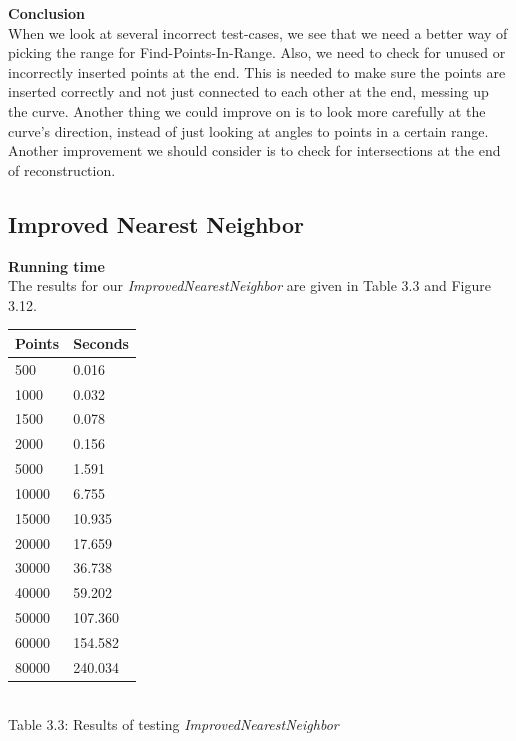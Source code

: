         \textbf{Conclusion}\\
        When we look at several incorrect test-cases, we see that we need a better way of picking the range for Find-Points-In-Range. Also, we need to check for unused or incorrectly inserted points at the end. This is needed to make sure the points are inserted correctly and not just connected to each other at the end, messing up the curve. Another thing we could improve on is to look more carefully at the curve's direction, instead of just looking at angles to points in a certain range. Another improvement we should consider is to check for intersections at the end of reconstruction.
\newpage
  \subsection{Improved Nearest Neighbor}
  \label{sub:inn_test_results}
    \textbf{Running time}\\
        The results for our \textit{ImprovedNearestNeighbor} are given in Table 3.3 and Figure 3.12.

        \begin{center}
          \begin{tabular}{|p{2.5cm}|p{2.5cm}|}
              \hline
              Points & Seconds\\
              \hline
              \hline
              500 & 0.016\\
              \hline
              1000 & 0.032\\
              \hline
              1500 & 0.078\\
              \hline
              2000 & 0.156\\
              \hline
              5000 & 1.591\\
              \hline
              10000 & 6.755\\
              \hline
              15000 & 10.935\\
              \hline
              20000 & 17.659\\
              \hline
              30000 & 36.738\\
              \hline
              40000 & 59.202\\
              \hline
              50000 & 107.360\\
              \hline
              60000 & 154.582\\
              \hline
              80000 & 240.034\\
              \hline
          \end{tabular}
          \label{tab:inn_runningtime}\\
          Table 3.3: Results of testing \textit{ImprovedNearestNeighbor}
        \end{center}

